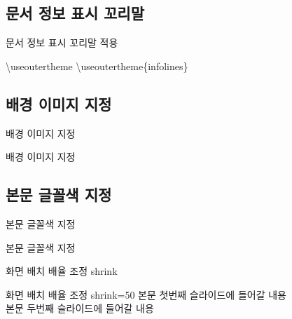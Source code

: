 \documentclass[10pt,xcolor=pdftex,dvipsnames,table,handout]{beamer}
\begin{document}
		\subsection{문서 정보 표시 꼬리말}
		\begin{frame}{문서 정보 표시 꼬리말 적용}

			\begin{block} {\textbackslash useoutertheme}
			\textbackslash useoutertheme\{infolines\}
			\end{block}
		\end{frame}


		\subsection{배경 이미지 지정}
		\begin{frame}[shrink=0]{배경 이미지 지정}

			\begin{block} {배경 이미지 지정}
			\end{block}
		\end{frame}


		\subsection{본문 글꼴색 지정}
		\begin{frame}[shrink=0]{본문 글꼴색 지정}

			\begin{block} {본문 글꼴색 지정}
			\end{block}
		\end{frame}






		\begin{frame}[shrink=50]{화면 배치 배율 조정 shrink}
			
			\begin{block} {화면 배치 배율 조정 shrink=50}
			본문 첫번째 슬라이드에 들어갈 내용\\
			본문 두번째 슬라이드에 들어갈 내용
			\end{block}

		\end{frame}
\end{document}
